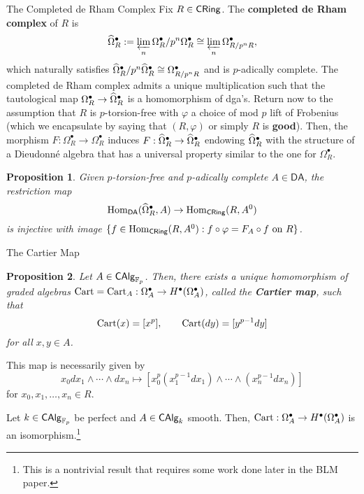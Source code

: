 \documentclass[aspectratio=1610]{beamer}
\newcommand{\Cart}{\textup{Cart}}
\newcommand{\DA}{\mathsf{DA}}
\renewcommand{\phi}{\varphi}
\newtheorem{proposition}{Proposition}
\begin{document}
\begin{frame}{The Completed de Rham Complex}
Fix $R\in\operatorname{\mathsf{CRing}}$. The \textbf{completed de Rham complex} of $R$ is 
$$\widehat{\Omega}_R^{\bullet}:=\displaystyle\varprojlim_n\Omega_R^{\bullet}/p^n\Omega_R^{\bullet}\cong\displaystyle\varprojlim_n\Omega_{R/p^nR}^{\bullet},$$
which naturally satisfies $\widehat{\Omega}_R^{\bullet}/p^n\widehat{\Omega}_R^{\bullet}\cong\Omega_{R/p^nR}^{\bullet}$ and is $p$-adically complete. The completed de Rham complex admits a unique multiplication such that the tautological map $\Omega_R^{\bullet}\to\widehat{\Omega}_R^{\bullet}$ is a homomorphism of dga's. Return now to the assumption that $R$ is $p$-torsion-free with $\phi$ a choice of mod $p$ lift of Frobenius (which we encapsulate by saying that $(R,\phi)$ or simply $R$ is \textbf{good}). Then, the morphism $F: \Omega_R^{\bullet}\to\Omega_R^{\bullet}$ induces $F: \widehat{\Omega}_R^{\bullet}\to\widehat{\Omega}_R^{\bullet}$ endowing $\widehat{\Omega}_R^{\bullet}$ with the structure of a Dieudonn\'{e} algebra that has a universal property similar to the one for $\Omega_R^{\bullet}$.

\begin{proposition}
Given $p$-torsion-free and $p$-adically complete $A\in\DA$, the restriction map
$$\Hom_{\DA}(\w{\Omega}_R^{\bullet},A)\to\Hom_{\CRing}(R,A^0)$$
is injective with image $\{f\in\Hom_{\CRing}(R,A^0) : f\circ\phi=F_A\circ f\textrm{ on }R\}$.
\end{proposition}
\end{frame}

\begin{frame}{The Cartier Map}
\begin{proposition}
Let $A\in\operatorname{\mathsf{CAlg}}_{\mathbb{F}_p}$. Then, there exists a unique homomorphism of graded algebras $\Cart=\Cart_A: \Omega_A^{\bullet}\to H^{\bullet}(\Omega_A^{\bullet})$, called the \textbf{Cartier map}, such that 
$$\Cart(x)=[x^p],\qquad \Cart(dy)=[y^{p-1}dy]$$
for all $x,y\in A$.
\end{proposition}

This map is necessarily given by 
$$x_0dx_1\wedge\cdots\wedge dx_n\mapsto[x_0^p(x_1^{p-1}dx_1)\wedge\cdots\wedge(x_n^{p-1}dx_n)]$$
for $x_0,x_1,\ldots,x_n\in R$.

\begin{theorem}
Let $k\in\operatorname{\mathsf{CAlg}}_{\mathbb{F}_p}$ be perfect and $A\in\operatorname{\mathsf{CAlg}}_k$ smooth. Then, $\Cart: \Omega_A^{\bullet}\to H^{\bullet}(\Omega_A^{\bullet})$ is an isomorphism.\footnote{This is a nontrivial result that requires some work done later in the BLM paper.}
\end{theorem}
\end{frame}
\end{document}
